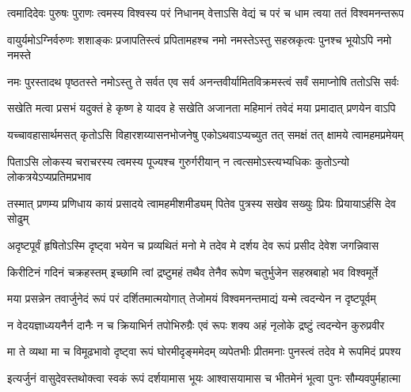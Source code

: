\fourlineindentedshloka
{त्वमादिदेवः पुरुषः पुराणः}
{त्वमस्य विश्वस्य परं निधानम्}
{वेत्ताऽसि वेद्यं च परं च धाम}
{त्वया ततं विश्वमनन्तरूप}%

\fourlineindentedshloka
{वायुर्यमोऽग्निर्वरुणः शशाङ्कः}
{प्रजापतिस्त्वं प्रपितामहश्च}
{नमो नमस्तेऽस्तु सहस्रकृत्वः}
{पुनश्च भूयोऽपि नमो नमस्ते}%

\fourlineindentedshloka
{नमः पुरस्तादथ पृष्ठतस्ते}
{नमोऽस्तु ते सर्वत एव सर्व}
{अनन्तवीर्यामितविक्रमस्त्वं}
{सर्वं समाप्नोषि ततोऽसि सर्वः}%

\fourlineindentedshloka
{सखेति मत्वा प्रसभं यदुक्तं}
{हे कृष्ण हे यादव हे सखेति}
{अजानता महिमानं तवेदं}
{मया प्रमादात् प्रणयेन वाऽपि}%

\fourlineindentedshloka
{यच्चावहासार्थमसत् कृतोऽसि}
{विहारशय्यासनभोजनेषु}
{एकोऽथवाऽप्यच्युत तत् समक्षं}
{तत् क्षामये त्वामहमप्रमेयम्}%

\fourlineindentedshloka
{पिताऽसि लोकस्य चराचरस्य}
{त्वमस्य पूज्यश्च गुरुर्गरीयान्}
{न त्वत्समोऽस्त्यभ्यधिकः कुतोऽन्यो}
{लोकत्रयेऽप्यप्रतिमप्रभाव}%

\fourlineindentedshloka
{तस्मात् प्रणम्य प्रणिधाय कायं}
{प्रसादये त्वामहमीशमीड्यम्}
{पितेव पुत्रस्य सखेव सख्युः}
{प्रियः प्रियायाऽर्हसि देव सोढुम्}%

\fourlineindentedshloka
{अदृष्टपूर्वं हृषितोऽस्मि दृष्ट्वा}
{भयेन च प्रव्यथितं मनो मे}
{तदेव मे दर्शय देव रूपं}
{प्रसीद देवेश जगन्निवास}%

\fourlineindentedshloka
{किरीटिनं गदिनं चक्रहस्तम्}
{इच्छामि त्वां द्रष्टुमहं तथैव}
{तेनैव रूपेण चतुर्भुजेन}
{सहस्रबाहो भव विश्वमूर्ते}%


\fourlineindentedshloka
{मया प्रसन्नेन तवार्जुनेदं}
{रूपं परं दर्शितमात्मयोगात्}
{तेजोमयं विश्वमनन्तमाद्यं}
{यन्मे त्वदन्येन न दृष्टपूर्वम्}%

\fourlineindentedshloka
{न वेदयज्ञाध्ययनैर्न दानैः}
{न च क्रियाभिर्न तपोभिरुग्रैः}
{एवं रूपः शक्य अहं नृलोके}
{द्रष्टुं त्वदन्येन कुरुप्रवीर}%

\fourlineindentedshloka
{मा ते व्यथा मा च विमूढभावो}
{दृष्ट्वा रूपं घोरमीदृङ्ममेदम्}
{व्यपेतभीः प्रीतमनाः पुनस्त्वं}
{तदेव मे रूपमिदं प्रपश्य}%


\fourlineindentedshloka
{इत्यर्जुनं वासुदेवस्तथोक्त्वा}
{स्वकं रूपं दर्शयामास भूयः}
{आश्वासयामास च भीतमेनं}
{भूत्वा पुनः सौम्यवपुर्महात्मा}%

